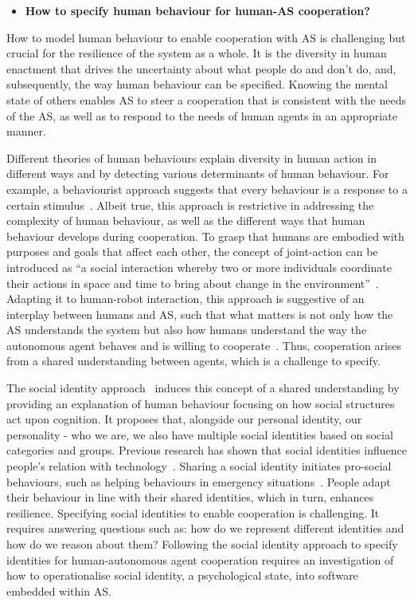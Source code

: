 \documentclass[sigconf,nonacm]{acmart}%
\begin{document}
	\begin{itemize}[leftmargin=0.5cm]
		\item \textbf{How to specify human behaviour for human-AS cooperation?}
	\end{itemize}
	How to model human behaviour to enable cooperation with AS is challenging but crucial for the resilience of the system as a whole. It is the diversity in human enactment that drives the uncertainty about what people do and don't do, and, subsequently, the way human behaviour can be specified. Knowing the mental state of others enables AS to steer a cooperation that is consistent with the needs of the AS, as well as to respond to the needs of human agents in an appropriate manner. 
	
	Different theories of human behaviours explain diversity in human action in different ways and by detecting various determinants of human behaviour. For example, a behaviourist approach suggests that every behaviour is a response to a certain stimulus~\cite{heimlich2008understanding}. Albeit true, this approach is restrictive in addressing the complexity of human behaviour, as well as the different ways that human behaviour develops during cooperation. To grasp that humans are embodied with purposes and goals that affect each other, the concept of joint-action can be introduced as ``a social interaction whereby two or more individuals coordinate their actions in space and time to bring about change in the environment''~\cite{sebanz2006joint}. Adapting it to human-robot interaction, this approach is suggestive of an interplay between humans and AS, such that what matters is not only how the AS understands the system but also how humans understand the way the autonomous agent behaves and is willing to cooperate~\cite{grigore:2013}. Thus, cooperation arises from a shared understanding between agents, which is a challenge to specify. 
	
	The social identity approach~\cite{spears2021social} induces this concept of a shared understanding by providing an explanation of human behaviour focusing on how social structures act upon cognition. It proposes that, alongside our personal identity, our personality - who we are, we also have multiple social identities based on social categories and groups. 
	Previous research has shown that social identities influence people's relation with technology~\cite{lee2001effect}. Sharing a social identity initiates pro-social behaviours, such as helping behaviours in emergency situations~\cite{drury2018role}. People adapt their behaviour in line with their shared identities, which in turn, enhances resilience. Specifying social identities to enable cooperation is challenging. It requires answering questions such as: how do we represent different identities and how do we reason about them? Following the social identity approach to specify identities for human-autonomous agent cooperation requires an investigation of how to operationalise social identity, a psychological state, into software embedded within AS.
	
\end{document}
